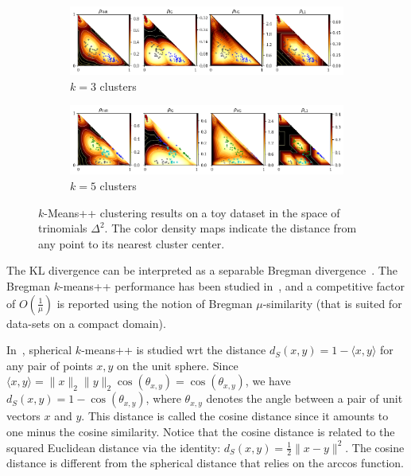 \documentclass[graybox]{svmult}
\def\inner#1#2{ \langle {#1},{#2} \rangle }
\begin{document}
\begin{figure}[t]
\centering
\begin{subfigure}{\textwidth}
\includegraphics[width=\textwidth]{plusplus3}
\caption{$k=3$ clusters}
\end{subfigure}
\begin{subfigure}{\textwidth}
\includegraphics[width=\textwidth]{plusplus5}
\caption{$k=5$ clusters}
\end{subfigure}
\caption{$k$-Means++ clustering results on a toy dataset in the space of trinomials $\Delta^2$.
The color density maps indicate the distance from any point to its nearest cluster center.}\label{fig:kmresults}
\end{figure}

The KL divergence can be interpreted as a separable Bregman divergence~\cite{BregmanKmeans-2010}.
The Bregman $k$-means++ performance has been studied in~\cite{BregmanKmeans-2010,smoothedBregmankMeans-2013},
and a competitive factor of $O(\frac{1}{\mu})$ is reported using the notion of Bregman $\mu$-similarity (that is suited for data-sets on a compact domain).

In~\cite{sphericalkm-2015}, spherical $k$-means++ is studied wrt the distance $d_S(x,y)=1-\inner{x}{y}$ for any pair of points $x,y$ on the unit sphere. 
Since $\inner{x}{y}=\|x\|_2 \|y\|_2 \cos(\theta_{x,y})=\cos(\theta_{x,y})$, we have  $d_S(x,y)=1-\cos(\theta_{x,y})$, where $\theta_{x,y}$ 
denotes the angle between a pair of unit vectors $x$ and $y$. This distance is called the cosine distance since it amounts to one minus the cosine similarity.
Notice that the cosine distance is related to the squared Euclidean distance via the identity: $d_S(x,y)=\frac{1}{2}\|x-y\|^2$.
The cosine distance is different from the spherical distance that relies on the arccos function.
\end{document}
